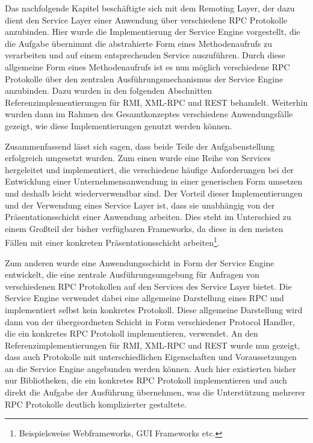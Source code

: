 Das nachfolgende Kapitel beschäftigte sich mit dem Remoting Layer, der dazu dient
den Service Layer einer Anwendung über verschiedene \ac{RPC} Protokolle
anzubinden. Hier wurde die Implementierung der Service Engine vorgestellt, die
die Aufgabe übernimmt die abstrahierte Form eines Methodenaufrufs zu verarbeiten
und auf einem entsprechenden Service auszuführen. Durch diese allgemeine Form
eines Methodenaufrufs ist es nun möglich verschiedene \ac{RPC} Protokolle über
den zentralen Ausführungsmechanismus der Service Engine anzubinden. Dazu wurden
in den folgenden Abschnitten Referenzimplementierungen für \ac{RMI}, XML-RPC und
\ac{REST} behandelt. Weiterhin wurden dann im Rahmen des Gesamtkonzeptes
verschiedene Anwendungsfälle gezeigt, wie diese Implementierungen genutzt werden
können.

Zusammenfassend lässt sich sagen, dass beide Teile der Aufgabenstellung
erfolgreich umgesetzt wurden. Zum einen wurde eine Reihe von Services
hergeleitet und implementiert, die verschiedene häufige Anforderungen bei der Entwicklung
einer Unternehmensanwendung in einer generischen Form umsetzen und deshalb leicht
wiederverwendbar sind. Der Vorteil dieser Implementierungen und der Verwendung
eines Service Layer ist, dass sie unabhängig von der Präsentationsschicht einer
Anwendung arbeiten. Dies steht im Unterschied zu einem Großteil der bisher
verfügbaren Frameworks, da diese in den meisten Fällen mit einer konkreten
Präsentationsschicht arbeiten\footnote{Beispielsweise Webframeworks, GUI
Frameworks etc.}.

Zum anderen wurde eine Anwendungsschicht in Form der Service Engine entwickelt,
die eine zentrale Ausführungsumgebung für Anfragen von verschiedenen \ac{RPC}
Protokollen auf den Services des Service Layer bietet. Die Service Engine
verwendet dabei eine allgemeine Darstellung eines \ac{RPC} und implementiert
selbst kein konkretes Protokoll. Diese allgemeine Darstellung wird dann von der
übergeordneten Schicht in Form verschiedener Protocol Handler, die ein konkretes
\ac{RPC} Protokoll implementieren, verwendet. An den Referenzimplementierungen für
\ac{RMI}, XML-RPC und \ac{REST} wurde nun gezeigt, dass auch Protokolle mit
unterschiedlichen Eigenschaften und Voraussetzungen an die Service Engine
angebunden werden können. Auch hier existierten bisher nur Bibliotheken,
die ein konkretes \ac{RPC} Protokoll implementieren und auch direkt die Aufgabe
der Ausführung übernehmen, was die Unterstützung mehrerer \ac{RPC}
Protokolle deutlich komplizierter gestaltete.

